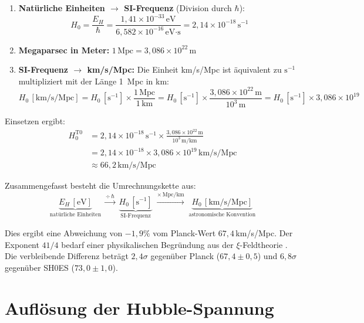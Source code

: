 	\begin{enumerate}
		\item \textbf{Natürliche Einheiten $\rightarrow$ SI-Frequenz} (Division durch $\hbar$):
		\begin{equation*}
			H_0 = \frac{E_H}{\hbar} = \frac{1{,}41 \times 10^{-33}\,\text{eV}}{6{,}582 \times 10^{-16}\,\text{eV·s}} = 2{,}14 \times 10^{-18}\,\text{s}^{-1}
		\end{equation*}
		\item \textbf{Megaparsec in Meter:} $1\,\text{Mpc} = 3{,}086 \times 10^{22}\,\text{m}$
		\item \textbf{SI-Frequenz $\rightarrow$ km/s/Mpc:} Die Einheit km/s/Mpc ist äquivalent zu $\text{s}^{-1}$ multipliziert mit der Länge 1~Mpc in km:
		\begin{equation*}
			H_0\,[\text{km/s/Mpc}] = H_0\,[\text{s}^{-1}] \times \frac{1\,\text{Mpc}}{1\,\text{km}} = H_0\,[\text{s}^{-1}] \times \frac{3{,}086 \times 10^{22}\,\text{m}}{10^{3}\,\text{m}} = H_0\,[\text{s}^{-1}] \times 3{,}086 \times 10^{19}
		\end{equation*}
	\end{enumerate}
	
	Einsetzen ergibt:
	\begin{align*}
		H_0^{\text{T0}} &= 2{,}14 \times 10^{-18}\,\text{s}^{-1} \times \frac{3{,}086 \times 10^{22}\,\text{m}}{10^3\,\text{m/km}} \\
		&= 2{,}14 \times 10^{-18} \times 3{,}086 \times 10^{19}\,\text{km/s/Mpc} \\
		&\approx 66{,}2\,\text{km/s/Mpc}
	\end{align*}
	
	Zusammengefasst besteht die Umrechnungskette aus:
	\begin{equation}
		\underbrace{E_H\,[\text{eV}]}_{\text{natürliche Einheiten}} \;\xrightarrow{\div\,\hbar}\; \underbrace{H_0\,[\text{s}^{-1}]}_{\text{SI-Frequenz}} \;\xrightarrow{\times\,\text{Mpc}/\text{km}}\; \underbrace{H_0\,[\text{km/s/Mpc}]}_{\text{astronomische Konvention}}
	\end{equation}
	
	Dies ergibt eine Abweichung von $-1{,}9\%$ vom Planck-Wert $67{,}4\,$km/s/Mpc. Der Exponent $41/4$ bedarf einer physikalischen Begründung aus der $\xi$-Feldtheorie \cite{riess2019}. Die verbleibende Differenz beträgt $2{,}4\sigma$ gegenüber Planck ($67{,}4 \pm 0{,}5$) und $6{,}8\sigma$ gegenüber SH0ES ($73{,}0 \pm 1{,}0$).
	
	\section{Auflösung der Hubble-Spannung}
	
